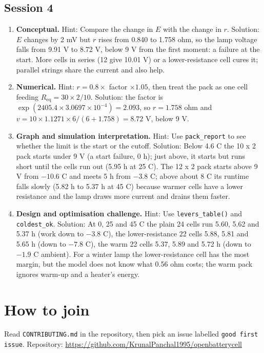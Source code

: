\documentclass[11pt,a4paper]{article}
\begin{document}
\subsection*{Session 4}
\begin{enumerate}[nosep]
\item \textbf{Conceptual.} Hint: Compare the change in $E$ with the change in $r$. Solution: $E$ changes by 2 mV but $r$ rises from 0.840 to 1.758 ohm, so the lamp voltage falls from 9.91 V to 8.72 V, below 9 V from the first moment: a failure at the start. More cells in series (12 give 10.01 V) or a lower-resistance cell cures it; parallel strings share the current and also help.
\item \textbf{Numerical.} Hint: $r=0.8\times$ factor $\times1.05$, then treat the pack as one cell feeding $R_{\mathrm{eq}}=30\times2/10$. Solution: the factor is $\exp(2405.4\times3.0697\times10^{-4})=2.093$, so $r=1.758$ ohm and $v=10\times1.1271\times6/(6+1.758)=8.72$ V, below 9 V.
\item \textbf{Graph and simulation interpretation.} Hint: Use \texttt{pack\_report} to see whether the limit is the start or the cutoff. Solution: Below 4.6 C the 10 x 2 pack starts under 9 V (a start failure, 0 h); just above, it starts but runs short until the cells run out (5.95 h at 25 C). The 12 x 2 pack starts above 9 V from $-10.6$ C and meets 5 h from $-3.8$ C; above about 8 C its runtime falls slowly (5.82 h to 5.37 h at 45 C) because warmer cells have a lower resistance and the lamp draws more current and drains them faster.
\item \textbf{Design and optimisation challenge.} Hint: Use \texttt{levers\_table()} and \texttt{coldest\_ok}. Solution: At 0, 25 and 45 C the plain 24 cells run 5.60, 5.62 and 5.37 h (work down to $-3.8$ C), the lower-resistance 22 cells 5.88, 5.81 and 5.65 h (down to $-7.8$ C), the warm 22 cells 5.37, 5.89 and 5.72 h (down to $-1.9$ C ambient). For a winter lamp the lower-resistance cell has the most margin, but the model does not know what 0.56 ohm costs; the warm pack ignores warm-up and a heater's energy.
\end{enumerate}

\section{How to join}
Read \texttt{CONTRIBUTING.md} in the repository, then pick an issue labelled \texttt{good first issue}. Repository: \url{https://github.com/KrunalPanchal1995/openbatterycell}
\end{document}
